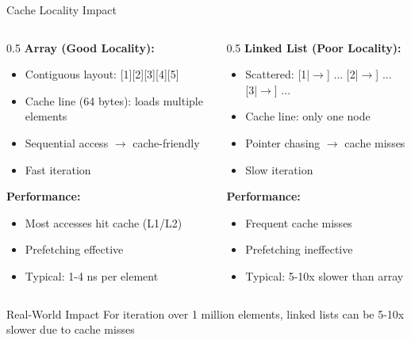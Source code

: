 \documentclass[aspectratio=169,xcolor=dvipsnames]{beamer}
\begin{document}
\begin{frame}{Cache Locality Impact}
  \begin{columns}
    \begin{column}{0.5\textwidth}
      \textbf{Array (Good Locality):}
      \begin{itemize}
        \item Contiguous layout: [1][2][3][4][5]
        \item Cache line (64 bytes): loads multiple elements
        \item Sequential access $\to$ cache-friendly
        \item Fast iteration
      \end{itemize}

      \vspace{0.3cm}
      \textbf{Performance:}
      \begin{itemize}
        \item Most accesses hit cache (L1/L2)
        \item Prefetching effective
        \item Typical: 1-4 ns per element
      \end{itemize}
    \end{column}

    \begin{column}{0.5\textwidth}
      \textbf{Linked List (Poor Locality):}
      \begin{itemize}
        \item Scattered: [1|$\to$] ... [2|$\to$] ... [3|$\to$] ...
        \item Cache line: only one node
        \item Pointer chasing $\to$ cache misses
        \item Slow iteration
      \end{itemize}

      \vspace{0.3cm}
      \textbf{Performance:}
      \begin{itemize}
        \item Frequent cache misses
        \item Prefetching ineffective
        \item Typical: 5-10x slower than array
      \end{itemize}
    \end{column}
  \end{columns}

  \vspace{0.3cm}
  \begin{block}{Real-World Impact}
    For iteration over 1 million elements, linked lists can be 5-10x slower due to cache misses
  \end{block}
\end{frame}
\end{document}
